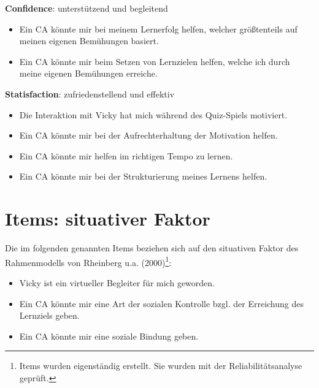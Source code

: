   \begin{minipage}[t]{0.45\textwidth}
  \textbf{Confidence}: unterstützend und begleitend
  \begin{itemize}
      \item \glqq Ein CA könnte mir bei meinem Lernerfolg helfen, welcher größtenteils auf meinen eigenen Bemühungen basiert.\grqq{}
      \item \glqq Ein CA könnte mir beim Setzen von Lernzielen helfen, welche ich durch meine eigenen Bemühungen erreiche.\grqq{} 
  \end{itemize}
  \end{minipage}
  \hfill
  \begin{minipage}[t]{0.45\textwidth}
  \textbf{Statisfaction}: zufriedenstellend und effektiv 
  \begin{itemize}
  \item \glqq Die Interaktion mit Vicky hat mich während des Quiz-Spiels motiviert.\grqq{} 
  \item \glqq Ein CA könnte mir bei der Aufrechterhaltung der Motivation helfen.\grqq{}  
  \item \glqq Ein CA könnte mir helfen im richtigen Tempo zu lernen.\grqq{}
  \end{itemize}
  \end{minipage}
  
  \begin{minipage}[t]{0.45\textwidth}
      \begin{itemize}
          \item \glqq Ein CA könnte mir bei der Strukturierung meines Lernens helfen.\grqq{}\\
      \end{itemize}
  \end{minipage}

  \section{Items: situativer Faktor} \label{SF}
  
  Die im folgenden genannten Items beziehen sich auf den situativen Faktor des Rahmenmodells von Rheinberg u.a. (2000)\footnote{Items wurden eigenständig erstellt. Sie wurden mit der Reliabilitätsanalyse geprüft. }: 
  \begin{itemize}
      \item \glqq Vicky ist ein virtueller Begleiter für mich geworden.\grqq{} 
      \item \glqq Ein CA könnte mir eine Art der sozialen Kontrolle bzgl. der Erreichung des Lernziels geben.\grqq{} 
      \item \glqq Ein CA könnte mir eine soziale Bindung geben.\grqq{} \\
  \end{itemize}
  

